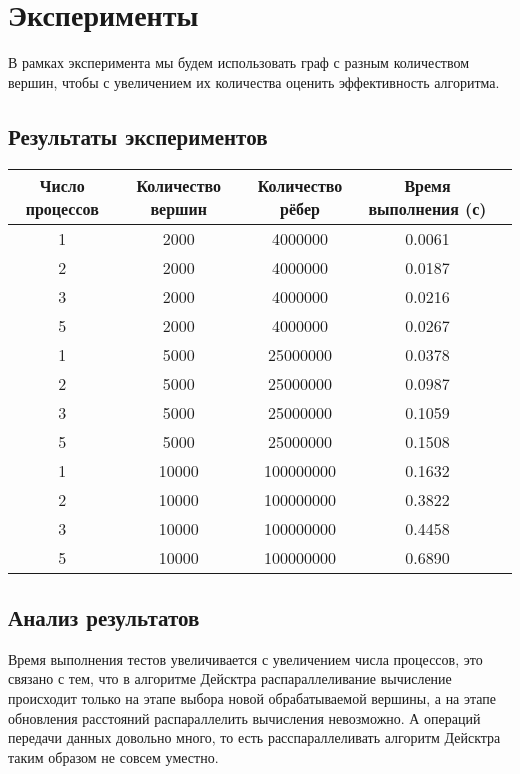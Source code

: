 \documentclass[12pt]{article}
\begin{document}
\section{Эксперименты}
 В рамках эксперимента мы будем использовать граф с разным количеством вершин, чтобы с увеличением их количества  оценить эффективность алгоритма.


\subsection*{Результаты экспериментов}
\begin{tabular}{|c|c|c|c|c|}
    \hline
    Число процессов & Количество вершин  &Количество рёбер   & Время выполнения (с)   \\ \hline
    1               & 2000               & 4000000           & 0.0061                 \\ \hline
    2               & 2000               & 4000000           & 0.0187                 \\ \hline
    3               & 2000               & 4000000           & 0.0216                 \\ \hline
    5               & 2000               & 4000000           & 0.0267                 \\ \hline
    1               & 5000               & 25000000          & 0.0378                 \\ \hline
    2               & 5000               & 25000000          & 0.0987                 \\ \hline
    3               & 5000               & 25000000          & 0.1059                 \\ \hline
    5               & 5000               & 25000000          & 0.1508                 \\ \hline
    1               & 10000              & 100000000         & 0.1632                 \\ \hline
    2               & 10000              & 100000000         & 0.3822                 \\ \hline
    3               & 10000              & 100000000         & 0.4458                 \\ \hline
    5               & 10000              & 100000000         & 0.6890                 \\ \hline
\end{tabular}

\subsection*{Анализ результатов}
Время выполнения тестов увеличивается с увеличением числа процессов, это связано с тем, что в алгоритме Дейсктра распараллеливание вычисление происходит только на этапе выбора новой обрабатываемой вершины, а на этапе обновления расстояний распараллелить вычисления невозможно. А операций передачи данных довольно много, то есть расспараллеливать алгоритм Дейсктра таким образом не совсем уместно.
\end{document}
